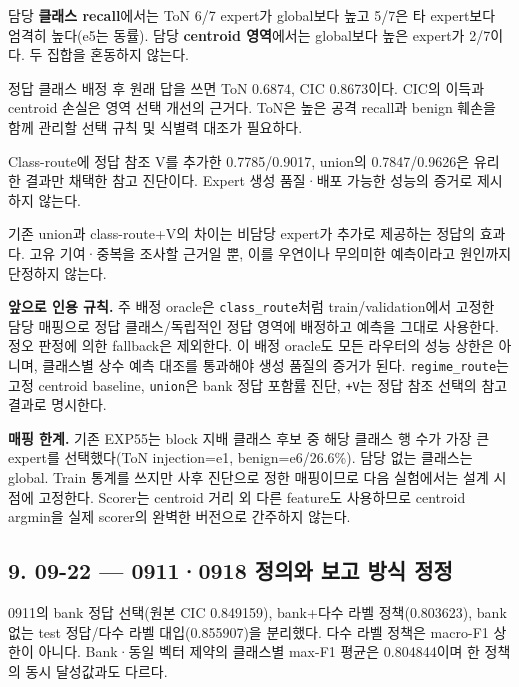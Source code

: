 \par\noindent \textbullet\enspace 담당 \textbf{클래스 recall}에서는 ToN 6/\allowbreak{}7 expert가 global보다 높고 5/\allowbreak{}7은 타 expert보다 엄격히 높다(e5는 동률). 담당 \textbf{centroid 영역}에서는 global보다 높은 expert가 2/\allowbreak{}7이다. 두 집합을 혼동하지 않는다.


\par\noindent \textbullet\enspace 정답 클래스 배정 후 원래 답을 쓰면 ToN 0.6874, CIC 0.8673이다. CIC의 이득과 centroid 손실은 영역 선택 개선의 근거다. ToN은 높은 공격 recall과 benign 훼손을 함께 관리할 선택 규칙 및 식별력 대조가 필요하다.


\par\noindent \textbullet\enspace Class-route에 정답 참조 V를 추가한 0.7785/\allowbreak{}0.9017, union의 0.7847/\allowbreak{}0.9626은 유리한 결과만 채택한 참고 진단이다. Expert 생성 품질·배포 가능한 성능의 증거로 제시하지 않는다.


\par\noindent \textbullet\enspace 기존 union과 class-route+\allowbreak{}V의 차이는 비담당 expert가 추가로 제공하는 정답의 효과다. 고유 기여·중복을 조사할 근거일 뿐, 이를 우연이나 무의미한 예측이라고 원인까지 단정하지 않는다.


\textbf{앞으로 인용 규칙.} 주 배정 oracle은 \texttt{class\_\allowbreak{}\allowbreak{}ro\allowbreak{}ute}처럼 train/\allowbreak{}validation에서 고정한 담당 매핑으로 정답 클래스/\allowbreak{}독립적인 정답 영역에 배정하고 예측을 그대로 사용한다. 정오 판정에 의한 fallback은 제외한다. 이 배정 oracle도 모든 라우터의 성능 상한은 아니며, 클래스별 상수 예측 대조를 통과해야 생성 품질의 증거가 된다. \texttt{regime\_\allowbreak{}\allowbreak{}r\allowbreak{}oute}는 고정 centroid baseline, \texttt{union}은 bank 정답 포함률 진단, \texttt{+\allowbreak{}\allowbreak{}V}는 정답 참조 선택의 참고 결과로 명시한다.

\textbf{매핑 한계.} 기존 EXP55는 block 지배 클래스 후보 중 해당 클래스 행 수가 가장 큰 expert를 선택했다(ToN injection=\allowbreak{}e1, benign=\allowbreak{}e6/\allowbreak{}26.6\%). 담당 없는 클래스는 global. Train 통계를 쓰지만 사후 진단으로 정한 매핑이므로 다음 실험에서는 설계 시점에 고정한다. Scorer는 centroid 거리 외 다른 feature도 사용하므로 centroid argmin을 실제 scorer의 완벽한 버전으로 간주하지 않는다.

\subsection{9. 09-22 — 0911·0918 정의와 보고 방식 정정}
\par\noindent \textbullet\enspace 0911의 bank 정답 선택(원본 CIC 0.849159), bank+\allowbreak{}다수 라벨 정책(0.803623), bank 없는 test 정답/\allowbreak{}다수 라벨 대입(0.855907)을 분리했다. 다수 라벨 정책은 macro-F1 상한이 아니다. Bank·동일 벡터 제약의 클래스별 max-F1 평균은 0.804844이며 한 정책의 동시 달성값과도 다르다.


